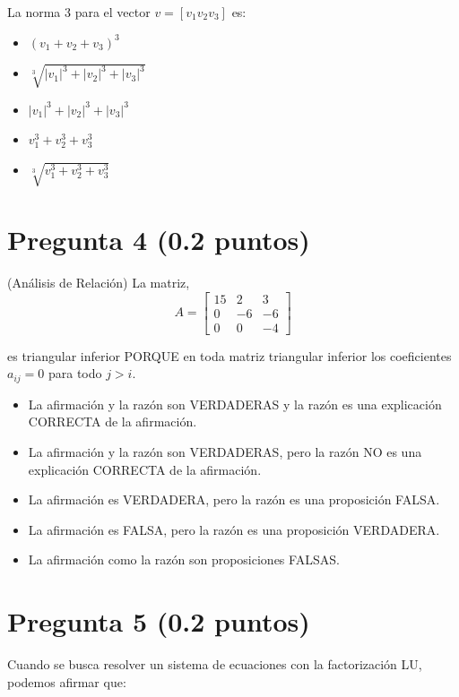 La norma 3 para el vector $v = [v_{1} v_{2} v_{3}]$ es:

\begin{itemize}
    \item $(v_{1} + v_{2} + v_{3})^3$
    \item $\sqrt[3]{|v_{1}|^3 + |v_{2}|^3 + |v_{3}|^3}$ \checkmark
    \item $|v_{1}|^3 + |v_{2}|^3 + |v_{3}|^3$
    \item $v_{1}^3 + v_{2}^3 + v_{3}^3$
    \item $\sqrt[3]{v_{1}^3 + v_{2}^3 + v_{3}^3}$
\end{itemize}

\section{Pregunta 4 (0.2 puntos)}

 (Análisis de Relación) La matriz,
\[ A =
    \begin{bmatrix}
        15 & 2  & 3  \\
        0  & -6 & -6 \\
        0  & 0  & -4
    \end{bmatrix}
\]

es triangular inferior PORQUE en toda matriz triangular inferior los coeficientes
$a_{ij} = 0$ para todo $j > i$.

\begin{itemize}
    \item La afirmación y la razón son VERDADERAS y la razón es una explicación CORRECTA
          de la afirmación.
    \item La afirmación y la razón son VERDADERAS, pero la razón NO es una explicación CORRECTA
          de la afirmación.
    \item La afirmación es VERDADERA, pero la razón es una proposición FALSA.
    \item La afirmación es FALSA, pero la razón es una proposición VERDADERA. \checkmark
    \item La afirmación como la razón son proposiciones FALSAS.
\end{itemize}

\section{Pregunta 5 (0.2 puntos)}

Cuando se busca resolver un sistema de ecuaciones con la factorización LU, podemos afirmar que:

